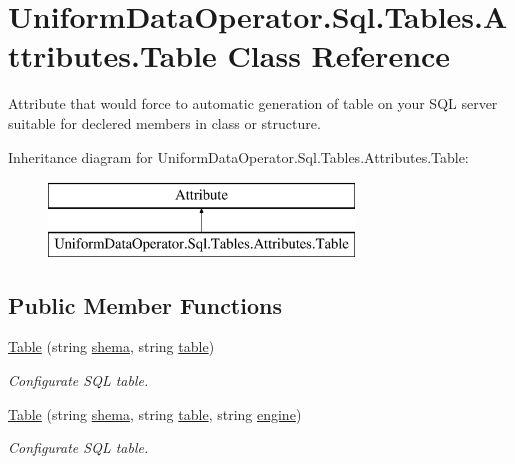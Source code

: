 \hypertarget{class_uniform_data_operator_1_1_sql_1_1_tables_1_1_attributes_1_1_table}{}\section{Uniform\+Data\+Operator.\+Sql.\+Tables.\+Attributes.\+Table Class Reference}
\label{class_uniform_data_operator_1_1_sql_1_1_tables_1_1_attributes_1_1_table}


Attribute that would force to automatic generation of table on your S\+QL server suitable for declered members in class or structure.  


Inheritance diagram for Uniform\+Data\+Operator.\+Sql.\+Tables.\+Attributes.\+Table\+:\begin{figure}[H]
\begin{center}
\leavevmode
\includegraphics[height=2.000000cm]{d4/db5/class_uniform_data_operator_1_1_sql_1_1_tables_1_1_attributes_1_1_table}
\end{center}
\end{figure}
\subsection*{Public Member Functions}
\begin{DoxyCompactItemize}
\item 
\mbox{\hyperlink{class_uniform_data_operator_1_1_sql_1_1_tables_1_1_attributes_1_1_table_a9a9520de93e5915cc5ba19876a46fd72}{Table}} (string \mbox{\hyperlink{class_uniform_data_operator_1_1_sql_1_1_tables_1_1_attributes_1_1_table_a7b9dd4e1623154ae8956d699bced397d}{shema}}, string \mbox{\hyperlink{class_uniform_data_operator_1_1_sql_1_1_tables_1_1_attributes_1_1_table_a107099bc2c29a01d3d4885751fe49c98}{table}})
\begin{DoxyCompactList}\small\item\em Configurate S\+QL table. \end{DoxyCompactList}\item 
\mbox{\hyperlink{class_uniform_data_operator_1_1_sql_1_1_tables_1_1_attributes_1_1_table_a0ebe98496d866be368b2c480a485c812}{Table}} (string \mbox{\hyperlink{class_uniform_data_operator_1_1_sql_1_1_tables_1_1_attributes_1_1_table_a7b9dd4e1623154ae8956d699bced397d}{shema}}, string \mbox{\hyperlink{class_uniform_data_operator_1_1_sql_1_1_tables_1_1_attributes_1_1_table_a107099bc2c29a01d3d4885751fe49c98}{table}}, string \mbox{\hyperlink{class_uniform_data_operator_1_1_sql_1_1_tables_1_1_attributes_1_1_table_a1d9e900b69ea04e44858116c6aa01983}{engine}})
\begin{DoxyCompactList}\small\item\em Configurate S\+QL table. \end{DoxyCompactList}\end{DoxyCompactItemize}
